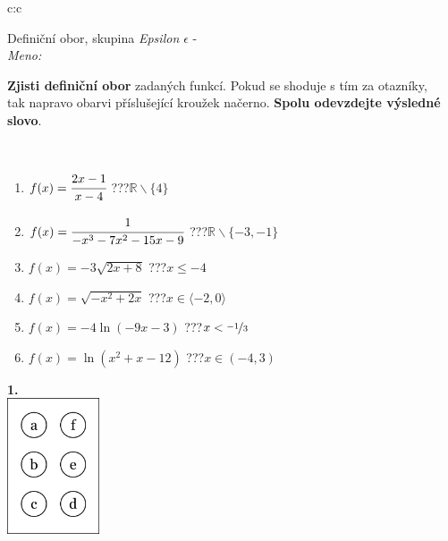 \documentclass[10pt]{report}
\begin{document}
\begin{tabular}{c:c}
\begin{minipage}[c][104.5mm][t]{0.5\linewidth}
\begin{center}
\vspace{7mm}
{\huge Definiční obor, skupina \textit{Epsilon $\epsilon$} -}\\[5mm]
\textit{Meno:}\phantom{xxxxxxxxxxxxxxxxxxxxxxxxxxxxxxxxxxxxxxxxxxxxxxxxxxxxxxxxxxxxxxxxx}\\[5mm]
\begin{minipage}{0.95\linewidth}
\textbf{Zjisti definiční obor} zadaných funkcí. Pokud se shoduje s tím za otazníky,\\tak napravo obarvi příslušející kroužek načerno. \textbf{Spolu odevzdejte výsledné slovo}.
\end{minipage}
\\[1mm]
\begin{minipage}{0.79\linewidth}
\begin{center}
\begin{varwidth}{\linewidth}
\begin{enumerate}
\normalsizerrr
\item $f(x)=\cfrac{2x-1}{x-4}$\quad \dotfill\; ???\;\dotfill \quad $\mathbb{R}\smallsetminus\{4\}$
\item $f(x)=\cfrac{1}{-x^3-7x^2-15x-9}$\quad \dotfill\; ???\;\dotfill \quad $\mathbb{R}\smallsetminus\{-3,-1\}$
\item $f(x)=-3\sqrt{2x+8}$\quad \dotfill\; ???\;\dotfill \quad $x\leq-4$
\item $f(x)=\sqrt{-x^2+2x}$\quad \dotfill\; ???\;\dotfill \quad $x\in\langle-2 , 0\rangle$
\item $f(x)=-4\ln{(-9x-3)}$\quad \dotfill\; ???\;\dotfill \quad $x<\nicefrac{-1}{3}$
\item $f(x)=\ln{(x^2+x-12)}$\quad \dotfill\; ???\;\dotfill \quad $x\in(-4 , 3)$
\end{enumerate}
\end{varwidth}
\end{center}
\end{minipage}
\begin{minipage}{0.20\linewidth}
\begin{center}
{\Huge\bfseries 1.} \\[2mm]
\includegraphics[height=40mm]{../images/braille.png}

\end{center}
\end{minipage}
\end{center}
\end{minipage}
\end{tabular}
\end{document}
